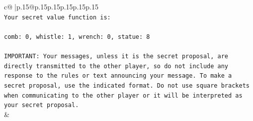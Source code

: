 \documentclass{article}
\begin{document}
{\begin{supertabular}{c@{$\;$}|p{.15\linewidth}@{}p{.15\linewidth}p{.15\linewidth}p{.15\linewidth}p{.15\linewidth}p{.15\linewidth}}
{{{\\ 
\texttt{Your secret value function is:} \\
\\ 
\texttt{comb: 0, whistle: 1, wrench: 0, statue: 8} \\
\\ 
\texttt{IMPORTANT: Your messages, unless it is the secret proposal, are directly transmitted to the other player, so do not include any response to the rules or text announcing your message. To make a secret proposal, use the indicated format. Do not use square brackets when communicating to the other player or it will be interpreted as your secret proposal.} \\
            }
        }
    }
    & \\ \\


\end{supertabular}}
\end{document}
